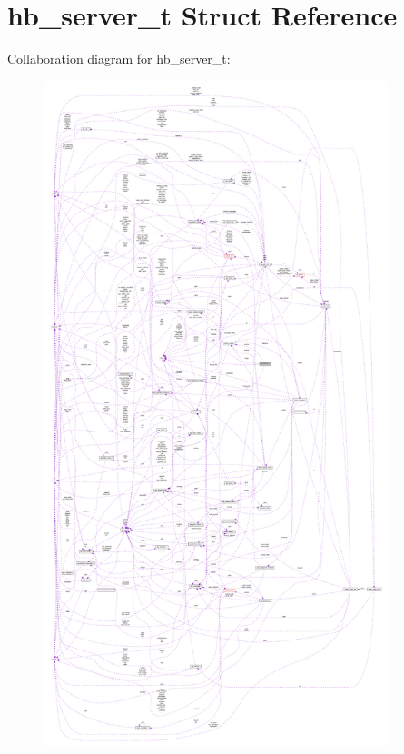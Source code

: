 \hypertarget{structhb__server__t}{}\section{hb\+\_\+server\+\_\+t Struct Reference}
\label{structhb__server__t}


Collaboration diagram for hb\+\_\+server\+\_\+t\+:
\nopagebreak
\begin{figure}[H]
\begin{center}
\leavevmode
\includegraphics[height=550pt]{structhb__server__t__coll__graph}
\end{center}
\end{figure}
